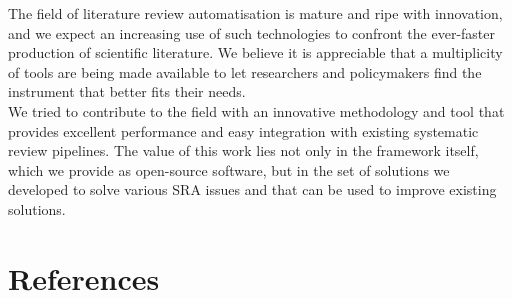 \documentclass{article}
\begin{document}
The field of literature review automatisation is mature and ripe with
innovation, and we expect an increasing use of such technologies to
confront the ever-faster production of scientific literature. We believe
it is appreciable that a multiplicity of tools are being made available
to let researchers and policymakers find the instrument that better fits
their needs.\\
We tried to contribute to the field with an innovative methodology and
tool that provides excellent performance and easy integration with
existing systematic review pipelines. The value of this work lies not
only in the framework itself, which we provide as open-source software,
but in the set of solutions we developed to solve various SRA issues and
that can be used to improve existing solutions.

\newpage

\hypertarget{references}{%
\section*{References}\label{references}}
\end{document}
